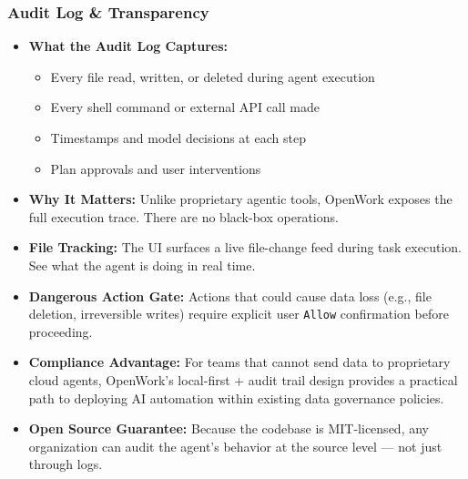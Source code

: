 \begin{frame}[fragile]\frametitle{Audit Log \& Transparency}
  \begin{itemize}
    \item \textbf{What the Audit Log Captures:}
      \begin{itemize}
        \item Every file read, written, or deleted during agent execution
        \item Every shell command or external API call made
        \item Timestamps and model decisions at each step
        \item Plan approvals and user interventions
      \end{itemize}
    \item \textbf{Why It Matters:} Unlike proprietary agentic tools, OpenWork exposes the full execution trace. There are no black-box operations.
    \item \textbf{File Tracking:} The UI surfaces a live file-change feed during task execution. See what the agent is doing in real time.
    \item \textbf{Dangerous Action Gate:} Actions that could cause data loss (e.g., file deletion, irreversible writes) require explicit user \texttt{Allow} confirmation before proceeding.
    \item \textbf{Compliance Advantage:} For teams that cannot send data to proprietary cloud agents, OpenWork's local-first + audit trail design provides a practical path to deploying AI automation within existing data governance policies.
    \item \textbf{Open Source Guarantee:} Because the codebase is MIT-licensed, any organization can audit the agent's behavior at the source level — not just through logs.
  \end{itemize}
\end{frame}


